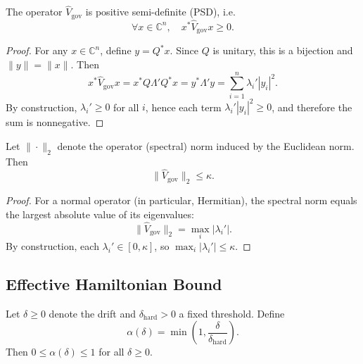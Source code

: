 \documentclass[11pt]{article}
\begin{document}
\begin{proposition}
The operator $\hat{V}_{\mathrm{gov}}$ is positive semi-definite (PSD), i.e.
\begin{equation}
  \forall x \in \mathbb{C}^n, \quad x^\ast \hat{V}_{\mathrm{gov}} x \ge 0.
\end{equation}
\end{proposition}

\begin{proof}
For any $x \in \mathbb{C}^n$, define $y = Q^\ast x$.
Since $Q$ is unitary, this is a bijection and $\|y\| = \|x\|$.
Then
\begin{equation}
  x^\ast \hat{V}_{\mathrm{gov}} x
  = x^\ast Q \Lambda' Q^\ast x
  = y^\ast \Lambda' y
  = \sum_{i=1}^{n} \lambda_i' |y_i|^2.
\end{equation}
By construction, $\lambda_i' \ge 0$ for all $i$, hence each term $\lambda_i' |y_i|^2 \ge 0$, and therefore the sum is nonnegative.
\end{proof}

\begin{proposition}
Let $\|\cdot\|_2$ denote the operator (spectral) norm induced by the Euclidean norm.
Then
\begin{equation}
  \|\hat{V}_{\mathrm{gov}}\|_2 \le \kappa.
\end{equation}
\end{proposition}

\begin{proof}
For a normal operator (in particular, Hermitian), the spectral norm equals the largest absolute value of its eigenvalues:
\begin{equation}
  \|\hat{V}_{\mathrm{gov}}\|_2
  = \max_{i} |\lambda_i'|.
\end{equation}
By construction, each $\lambda_i' \in [0,\kappa]$, so $\max_i |\lambda_i'| \le \kappa$.
\end{proof}

\subsection{Effective Hamiltonian Bound}

\begin{definition}
Let $\delta \ge 0$ denote the drift and $\delta_{\mathrm{hard}} > 0$ a fixed threshold.
Define
\begin{equation}
  \alpha(\delta) = \min\left(1, \frac{\delta}{\delta_{\mathrm{hard}}}\right).
\end{equation}
Then $0 \le \alpha(\delta) \le 1$ for all $\delta \ge 0$.
\end{definition}
\end{document}
